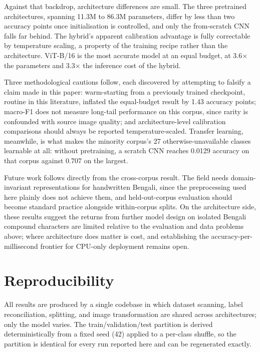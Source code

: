 Against that backdrop, architecture differences are small. The three pretrained architectures, spanning 11.3M to 86.3M parameters, differ by less than two accuracy points once initialisation is controlled, and only the from-scratch CNN falls far behind. The hybrid's
apparent calibration advantage is fully correctable by temperature
scaling, a property of the training recipe rather than the
architecture. ViT-B/16 is the most accurate model at an equal budget, at
3.6× the parameters and 3.3× the inference cost of the hybrid.

Three methodological cautions follow, each discovered by attempting to
falsify a claim made in this paper: warm-starting from a previously
trained checkpoint, routine in this literature, inflated the
equal-budget result by 1.43 accuracy points; macro-F1 does not measure
long-tail performance on this corpus, since rarity is confounded with
source image quality; and architecture-level calibration comparisons
should always be reported temperature-scaled. Transfer learning,
meanwhile, is what makes the minority corpus's 27 otherwise-unavailable
classes learnable at all: without pretraining, a scratch CNN reaches
0.0129 accuracy on that corpus against 0.707 on the largest.

Future work follows directly from the cross-corpus result. The field
needs domain-invariant representations for handwritten Bengali, since
the preprocessing used here plainly does not achieve them, and
held-out-corpus evaluation should become standard practice alongside
within-corpus splits. On the architecture side, these results suggest
the returns from further model design on isolated Bengali compound
characters are limited relative to the evaluation and data problems
above; where architecture does matter is cost, and establishing the
accuracy-per-millisecond frontier for CPU-only deployment remains open.


\hypertarget{reproducibility}{%
\section{Reproducibility}\label{reproducibility}}

All results are produced by a single codebase in which dataset scanning,
label reconciliation, splitting, and image transformation are shared
across architectures; only the model varies. The train/validation/test
partition is derived deterministically from a fixed seed (42) applied to
a per-class shuffle, so the partition is identical for every run
reported here and can be regenerated exactly.

